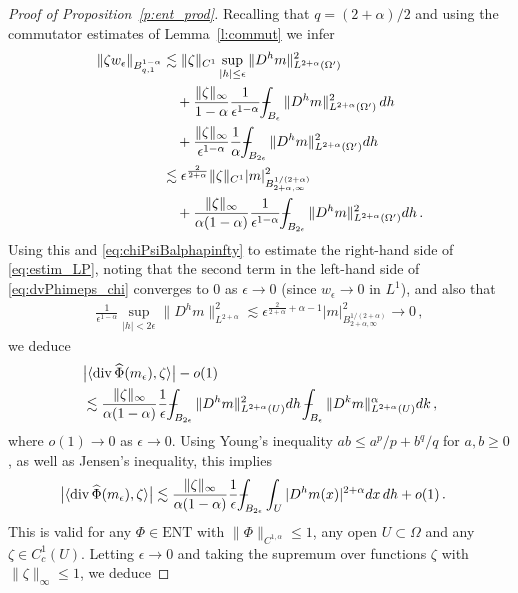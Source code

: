 \documentclass[fleqn
]{article}
\numberwithin{equation}{section}
\newcommand{\e}{\epsilon}
\DeclareMathOperator{\dv}{div}
\def\Xint#1{\mathchoice
	{\XXint\displaystyle\textstyle{#1}}%
	{\XXint\textstyle\scriptstyle{#1}}%
	{\XXint\scriptstyle\scriptscriptstyle{#1}}%
	{\XXint\scriptscriptstyle\scriptscriptstyle{#1}}%
	\!\int}
\def\XXint#1#2#3{{\setbox0=\hbox{$#1{#2#3}{\int}$}
		\vcenter{\hbox{$#2#3$}}\kern-.5\wd0}}
\theoremstyle{definition}
\begin{document}
\begin{proof}[Proof of Proposition~\ref{p:ent_prod}]
Recalling that $q=(2+\alpha)/2$ and
using the commutator estimates of Lemma~\ref{l:commut} we 
infer
\begin{align*}
\|\zeta w_\e\|_{B^{1-\alpha}_{q,1}}
&
\lesssim \|\zeta\|_{C^1}
\sup_{|h|\leq\e}
 \|D^h m\|^2_{L^{2+\alpha}(\Omega')}
 \\
 &
 \quad
+\frac{\|\zeta\|_\infty}{1-\alpha}  \frac{1}{\e^{1-\alpha}}
\Xint{-}_{B_\e}
 \|D^h m\|^2_{L^{2+\alpha}(\Omega')}\, dh
\\
&
\quad
+\frac{ \|\zeta\|_\infty}{\e^{1-\alpha}}\frac{1}{\alpha} 
\Xint{-}_{B_{2\e}}
 \|D^h m\|^2_{L^{2+\alpha}(\Omega')}
 dh
 \\
 &
 \lesssim \e^{\frac{2}{2+\alpha}} \|\zeta\|_{C^1} |m|^2_{B^{1/(2+\alpha)}_{2+\alpha,\infty}}
 \\
 &
 \quad
 +
 \frac{\|\zeta\|_\infty}{\alpha(1-\alpha)}
\frac{1}{\e^{1-\alpha}}
  \Xint{-}_{B_{2\e}}
 \|D^h m\|^2_{L^{2+\alpha}(\Omega')} dh\,.
\end{align*}
Using this and \eqref{eq:chiPsiBalphapinfty} 
to estimate the right-hand side of \eqref{eq:estim_LP},
 noting that the second term in the left-hand side of \eqref{eq:dvPhimeps_chi} converges to 0 as $\e\to 0$ 
(since $w_\e\to 0$ in $L^1$),
and also that 
\begin{align*}
\frac{1}{\e^{1-\alpha}}\sup_{|h|<2\e}\|D^h m\|^2_{L^{2+\alpha}} \lesssim \e^{\frac{2}{2+\alpha}+\alpha -1}|m|^2_{B^{1/(2+\alpha)}_{2+\alpha,\infty}}\to 0\,,
\end{align*}
 we deduce
\begin{align*}
&
\big|
\langle \dv\widehat\Phi(m_\e),\zeta\rangle
\big| -o(1)
\\
&
\lesssim
\frac{\|\zeta\|_\infty}{\alpha(1-\alpha)}
\frac{1}{\e}
  \Xint{-}_{B_{2\e}}
 \|D^h m\|^2_{L^{2+\alpha}(U)} dh
 \,
   \Xint{-}_{B_{\e}}
 \|D^k m\|^\alpha_{L^{2+\alpha}(U)} dk\,,
\end{align*}
where $o(1)\to 0$ as $\e\to 0$.
Using Young's inequality $ab\leq a^p/p +b^q/q$ for $a,b\geq 0$, 
as well as Jensen's inequality,
this implies
\begin{align*}
&
\big|
\langle \dv\widehat\Phi(m_\e),\zeta\rangle
\big| 
\lesssim
\frac{\|\zeta\|_\infty}{\alpha(1-\alpha)}
\frac{1}{\e}
  \Xint{-}_{B_{2\e}}
\int_{U} |D^h m(x)|^{2+\alpha}dx\, dh
+o(1)\,.
\end{align*}
This is valid for any $\Phi\in\mathrm{ENT}$ with $\|\Phi\|_{C^{1,\alpha}}\leq 1$, any open $U\subset\Omega$ and any $\zeta\in C_c^1(U)$. 
Letting $\e\to 0$ and taking the supremum over functions $\zeta$ with $\|\zeta\|_\infty\leq 1$, we deduce

\end{proof}
\end{document}
